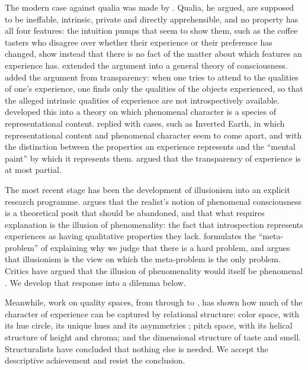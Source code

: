 \documentclass{situationist-preprint}
\begin{document}
The modern case against qualia was made by \citet{Dennett1988}. Qualia, he argued, are supposed to be ineffable, intrinsic, private and directly apprehensible, and no property has all four features: the intuition pumps that seem to show them, such as the coffee tasters who disagree over whether their experience or their preference has changed, show instead that there is no fact of the matter about which features an experience has. \citet{Dennett1991} extended the argument into a general theory of consciousness. \citet{Harman1990} added the argument from transparency: when one tries to attend to the qualities of one's experience, one finds only the qualities of the objects experienced, so that the alleged intrinsic qualities of experience are not introspectively available. \citet{Tye1995} developed this into a theory on which phenomenal character is a species of representational content. \citet{Block1990,Block1996} replied with cases, such as Inverted Earth, in which representational content and phenomenal character seem to come apart, and with the distinction between the properties an experience represents and the \enquote{mental paint} by which it represents them. \citet{Kind2003} argued that the transparency of experience is at most partial.

The most recent stage has been the development of illusionism into an explicit research programme. \citet{Frankish2016} argues that the realist's notion of phenomenal consciousness is a theoretical posit that should be abandoned, and that what requires explanation is the illusion of phenomenality: the fact that introspection represents experiences as having qualitative properties they lack. \citet{Chalmers2018} formulates the \enquote{meta-problem} of explaining why we judge that there is a hard problem, and argues that illusionism is the view on which the meta-problem is the only problem. Critics have argued that the illusion of phenomenality would itself be phenomenal \citep{Balog2016,Schwitzgebel2016}. We develop that response into a dilemma below.

Meanwhile, work on quality spaces, from \citet{Clark1993} through \citet{Palmer1999} to \citet{Lee2021}, has shown how much of the character of experience can be captured by relational structure: color space, with its hue circle, its unique hues and its asymmetries \citep{Hardin1988}; pitch space, with its helical structure of height and chroma; and the dimensional structure of taste and smell. Structuralists have concluded that nothing else is needed. We accept the descriptive achievement and resist the conclusion.
\end{document}
